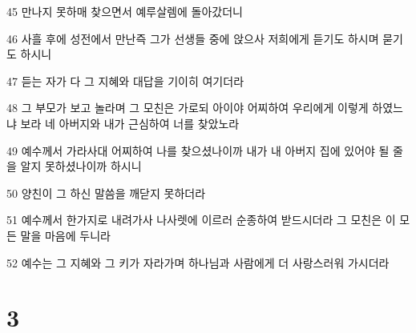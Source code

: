 \par 45 만나지 못하매 찾으면서 예루살렘에 돌아갔더니
\par 46 사흘 후에 성전에서 만난즉 그가 선생들 중에 앉으사 저희에게 듣기도 하시며 묻기도 하시니
\par 47 듣는 자가 다 그 지혜와 대답을 기이히 여기더라
\par 48 그 부모가 보고 놀라며 그 모친은 가로되 아이야 어찌하여 우리에게 이렇게 하였느냐 보라 네 아버지와 내가 근심하여 너를 찾았노라
\par 49 예수께서 가라사대 어찌하여 나를 찾으셨나이까 내가 내 아버지 집에 있어야 될 줄을 알지 못하셨나이까 하시니
\par 50 양친이 그 하신 말씀을 깨닫지 못하더라
\par 51 예수께서 한가지로 내려가사 나사렛에 이르러 순종하여 받드시더라 그 모친은 이 모든 말을 마음에 두니라
\par 52 예수는 그 지혜와 그 키가 자라가며 하나님과 사람에게 더 사랑스러워 가시더라

\chapter{3}

